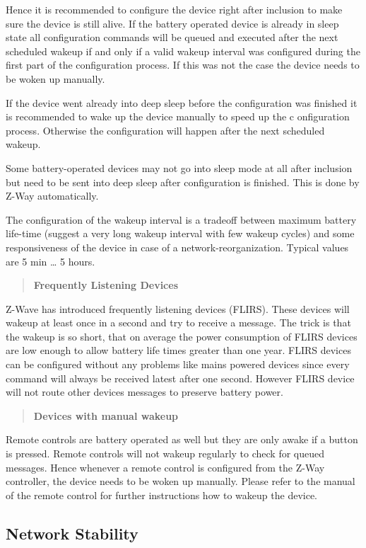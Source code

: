 Hence it is recommended to configure the device right after inclusion to make sure the device is still alive. If the battery operated device is already in 
sleep state all configuration commands will be queued and executed after the next scheduled wakeup if and only if a valid wakeup interval was configured 
during the first part of the configuration process. If this was not the case the device needs to be woken up manually.

If the device went already into deep sleep before the configuration was finished it is recommended to wake up the device manually to speed up the c
onfiguration process. Otherwise the configuration will happen after the next scheduled wakeup.

Some battery-operated devices may not go into sleep mode at all after inclusion but need to be sent into deep sleep after configuration is finished. 
This is done by Z-Way automatically.

The configuration of the wakeup interval is a tradeoff between maximum battery life-time  (suggest a very long wakeup interval with few wakeup cycles) 
and some responsiveness of the device in case of a network-reorganization. Typical values are 5 min … 5 hours.

\begin{quote}
{\bf Frequently Listening Devices}
\end{quote}
Z-Wave has introduced frequently listening devices (FLIRS). These devices will wakeup at least once in a second and try to receive a message. The trick 
is that the wakeup is so short, that on average the power consumption of FLIRS devices are low enough to allow battery life times greater than one year. 
FLIRS devices can be configured without any problems like mains powered devices since every command will always be received latest after one second.
However FLIRS device will not route other devices messages to preserve battery power.
\begin{quote}
{\bf Devices with manual wakeup}
\end{quote}
Remote controls are battery operated as well but they are only awake if a button is pressed. Remote controls will not wakeup regularly to check for queued 
messages. Hence whenever a remote control is configured from the Z-Way controller, the device needs to be woken up manually. Please refer to the manual 
of the remote control for further instructions how to wakeup the device.  

\subsection {Network Stability}

